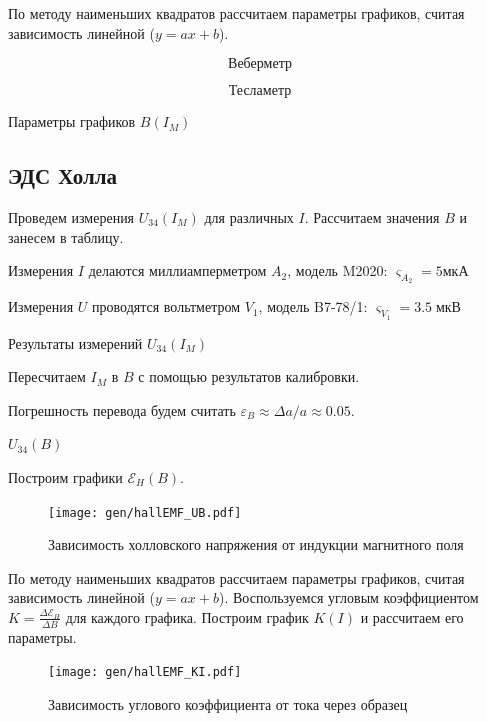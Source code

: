 \documentclass[12pt,a4paper]{article}
\begin{document}
	По методу наименьших квадратов рассчитаем параметры графиков, считая зависимость линейной ($y = ax + b$).
	
	\begin{table}[H]
		$$ \text{Веберметр} $$
		
		$$ \text{Тесламетр} $$
		
		\caption{Параметры графиков $B(I_M)$}
	\end{table}
	
	\subsection*{ЭДС Холла}

	Проведем измерения $U_{34}(I_M)$ для различных $I$. Рассчитаем значения $B$ и занесем в таблицу.
	
	Измерения $I$ делаются миллиамперметром $A_2$, модель M2020: $\varsigma_{A_2} = 5 мкА $
	
	Измерения $U$ проводятся вольтметром $V_1$, модель B7-78/1: $\varsigma_{V_1} = 3.5 \; \text{мкВ}$
	
	\begin{table}[H]
		\addtolength{\tabcolsep}{-4pt}
		\footnotesize
		
		\caption{Результаты измерений $U_{34}(I_M)$}
	\end{table}
	
	Пересчитаем $I_M$ в $B$ с помощью результатов калибровки.
	
	Погрешность перевода будем считать $\varepsilon_B \approx \Delta a / a \approx 0.05$.
	
	\begin{table}[H]
		\addtolength{\tabcolsep}{-4pt}
		\footnotesize
		
		\caption{$U_{34}(B)$}
	\end{table}
	
	Построим графики $\mathcal{E}_H(B)$.
	
	\begin{figure}[H]
		\texttt{[image: gen/hallEMF\_UB.pdf]}
		\caption{Зависимость холловского напряжения от индукции магнитного поля}
	\end{figure}

	По методу наименьших квадратов рассчитаем параметры графиков, считая зависимость линейной ($y = ax + b$). Воспользуемся угловым коэффициентом $K = \frac{\Delta \mathcal{E}_H}{\Delta B}$ для каждого графика. Построим график $K(I)$ и рассчитаем его параметры.
	
	\begin{figure}[H]
		\texttt{[image: gen/hallEMF\_KI.pdf]}
		\caption{Зависимость углового коэффициента от тока через образец}
	\end{figure}
	
\end{document}
